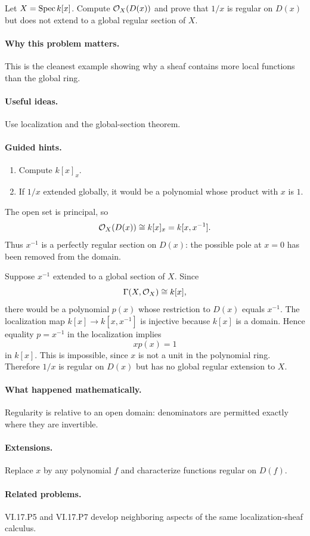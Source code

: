 \begin{problem}\label{prob:vi17-p06}
Let $X=\operatorname{Spec} k[x]$.  Compute $\mathcal O_X(D(x))$ and prove that $1/x$ is regular on $D(x)$ but does not extend to a global regular section of $X$.
\end{problem}

\ifdefined\FullProblemDossiers
\paragraph{Why this problem matters.}
This is the cleanest example showing why a sheaf contains more local functions than the global ring.

\paragraph{Useful ideas.}
Use localization and the global-section theorem.

\paragraph{Guided hints.}
\begin{enumerate}
\item Compute $k[x]_x$.
\item If $1/x$ extended globally, it would be a polynomial whose product with $x$ is $1$.
\end{enumerate}

\begin{solution}
The open set is principal, so
\[
\mathcal O_X(D(x))\cong k[x]_x=k[x,x^{-1}].
\]
Thus $x^{-1}$ is a perfectly regular section on $D(x)$: the possible pole at $x=0$ has been removed from the domain.

Suppose $x^{-1}$ extended to a global section of $X$.  Since
\[
\Gamma(X,\mathcal O_X)\cong k[x],
\]
there would be a polynomial $p(x)$ whose restriction to $D(x)$ equals $x^{-1}$.  The localization map $k[x]\to k[x,x^{-1}]$ is injective because $k[x]$ is a domain.  Hence equality $p=x^{-1}$ in the localization implies
\[
xp(x)=1
\]
in $k[x]$.  This is impossible, since $x$ is not a unit in the polynomial ring.  Therefore $1/x$ is regular on $D(x)$ but has no global regular extension to $X$.
\end{solution}



\paragraph{What happened mathematically.}
Regularity is relative to an open domain: denominators are permitted exactly where they are invertible.

\paragraph{Extensions.}
Replace $x$ by any polynomial $f$ and characterize functions regular on $D(f)$.

\paragraph{Related problems.}
VI.17.P5 and VI.17.P7 develop neighboring aspects of the same localization-sheaf calculus.
\fi
